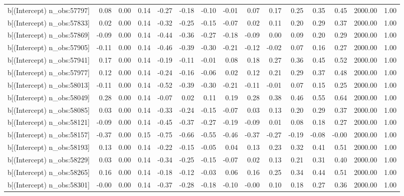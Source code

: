 \begin{table}[ht]
\begin{tabular}{rrrrrrrrrrrrrrr}
  b[(Intercept) n\_obs:57797] & 0.08 & 0.00 & 0.14 & -0.27 & -0.18 & -0.10 & -0.01 & 0.07 & 0.17 & 0.25 & 0.35 & 0.45 & 2000.00 & 1.00 \\ 
  b[(Intercept) n\_obs:57833] & 0.02 & 0.00 & 0.14 & -0.32 & -0.25 & -0.15 & -0.07 & 0.02 & 0.11 & 0.20 & 0.29 & 0.37 & 2000.00 & 1.00 \\ 
  b[(Intercept) n\_obs:57869] & -0.09 & 0.00 & 0.14 & -0.44 & -0.36 & -0.27 & -0.18 & -0.09 & 0.00 & 0.09 & 0.20 & 0.29 & 2000.00 & 1.00 \\ 
  b[(Intercept) n\_obs:57905] & -0.11 & 0.00 & 0.14 & -0.46 & -0.39 & -0.30 & -0.21 & -0.12 & -0.02 & 0.07 & 0.16 & 0.27 & 2000.00 & 1.00 \\ 
  b[(Intercept) n\_obs:57941] & 0.17 & 0.00 & 0.14 & -0.19 & -0.11 & -0.01 & 0.08 & 0.18 & 0.27 & 0.36 & 0.45 & 0.52 & 2000.00 & 1.00 \\ 
  b[(Intercept) n\_obs:57977] & 0.12 & 0.00 & 0.14 & -0.24 & -0.16 & -0.06 & 0.02 & 0.12 & 0.21 & 0.29 & 0.37 & 0.48 & 2000.00 & 1.00 \\ 
  b[(Intercept) n\_obs:58013] & -0.11 & 0.00 & 0.14 & -0.52 & -0.39 & -0.30 & -0.21 & -0.11 & -0.01 & 0.07 & 0.15 & 0.25 & 2000.00 & 1.00 \\ 
  b[(Intercept) n\_obs:58049] & 0.28 & 0.00 & 0.14 & -0.07 & 0.02 & 0.11 & 0.19 & 0.28 & 0.38 & 0.46 & 0.55 & 0.64 & 2000.00 & 1.00 \\ 
  b[(Intercept) n\_obs:58085] & 0.03 & 0.00 & 0.14 & -0.33 & -0.24 & -0.15 & -0.07 & 0.03 & 0.13 & 0.20 & 0.29 & 0.37 & 2000.00 & 1.00 \\ 
  b[(Intercept) n\_obs:58121] & -0.09 & 0.00 & 0.14 & -0.45 & -0.37 & -0.27 & -0.19 & -0.09 & 0.01 & 0.08 & 0.18 & 0.27 & 2000.00 & 1.00 \\ 
  b[(Intercept) n\_obs:58157] & -0.37 & 0.00 & 0.15 & -0.75 & -0.66 & -0.55 & -0.46 & -0.37 & -0.27 & -0.19 & -0.08 & -0.00 & 2000.00 & 1.00 \\ 
  b[(Intercept) n\_obs:58193] & 0.13 & 0.00 & 0.14 & -0.22 & -0.15 & -0.05 & 0.04 & 0.13 & 0.23 & 0.32 & 0.41 & 0.51 & 2000.00 & 1.00 \\ 
  b[(Intercept) n\_obs:58229] & 0.03 & 0.00 & 0.14 & -0.34 & -0.25 & -0.15 & -0.07 & 0.02 & 0.13 & 0.21 & 0.31 & 0.40 & 2000.00 & 1.00 \\ 
  b[(Intercept) n\_obs:58265] & 0.16 & 0.00 & 0.14 & -0.18 & -0.12 & -0.03 & 0.06 & 0.16 & 0.25 & 0.34 & 0.44 & 0.51 & 2000.00 & 1.00 \\ 
  b[(Intercept) n\_obs:58301] & -0.00 & 0.00 & 0.14 & -0.37 & -0.28 & -0.18 & -0.10 & -0.00 & 0.10 & 0.18 & 0.27 & 0.36 & 2000.00 & 1.00 \\ 

\end{tabular}
\end{table}
